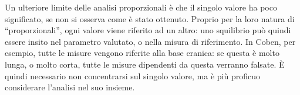 Un ulteriore limite delle analisi proporzionali è che il singolo valore ha poco significato, se non si osserva come è stato ottenuto. Proprio per la loro natura di ``proporzionali'', ogni valore viene riferito ad un altro: uno squilibrio può quindi essere insito nel parametro valutato, o nella misura di riferimento. In Coben, per esempio, tutte le misure vengono riferite alla base cranica: se questa è molto lunga, o molto corta, tutte le misure dipendenti da questa verranno falsate. È quindi necessario non concentrarsi sul singolo valore, ma è più proficuo considerare l'analisi nel suo insieme.

